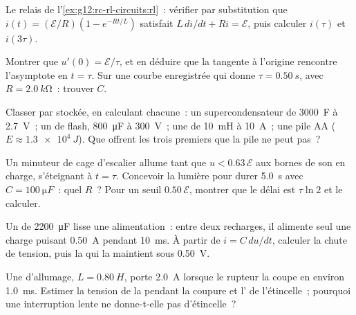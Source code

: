\begin{exercise}[$\star\star$]\label{exo:g12:rc-rl-circuits:10}
Le relais de l'\cref{ex:g12:rc-rl-circuits:rl}~: vérifier par
substitution que $i(t) = (\mathcal{E}/R)(1 - e^{-Rt/L})$ satisfait
$L\,di/dt + Ri = \mathcal{E}$, puis calculer $i(\tau)$ et $i(3\tau)$.
\end{exercise}

\begin{exercise}[$\star\star$]\label{exo:g12:rc-rl-circuits:11}
Montrer que $u'(0) = \mathcal{E}/\tau$, et en déduire que la tangente
à l'origine rencontre l'asymptote en $t = \tau$. Sur une courbe
enregistrée qui donne $\tau = \qty{0.50}{s}$, avec
$R = \qty{2.0}{k\ohm}$~: trouver $C$.
\end{exercise}

\begin{exercise}[$\star\star\star$]\label{exo:g12:rc-rl-circuits:12}
Classer par  stockée, en calculant chacune~: un
supercondensateur de \qty{3000}{F} à \qty{2.7}{V}~; un
 de flash, \qty{800}{\micro F} à
\qty{300}{V}~; une  de \qty{10}{mH} à
\qty{10}{A}~; une pile AA ($E \approx \qty{1.3e4}{J}$). Que offrent
les trois premiers que la pile ne peut pas~?
\end{exercise}

\begin{exercise}[$\star\star\star$]\label{exo:g12:rc-rl-circuits:13}
Un minuteur de cage d'escalier allume tant que $u < 0.63\,\mathcal{E}$
aux bornes de son  en charge, s'éteignant à
$t = \tau$. Concevoir la lumière pour durer \qty{5.0}{s} avec
$C = \qty{100}{\micro F}$~: quel $R$~? Pour un seuil
$0.50\,\mathcal{E}$, montrer que le délai est
$\tau \ln 2$ et le calculer.
\end{exercise}

\begin{exercise}[$\star\star\star$]\label{exo:g12:rc-rl-circuits:14}
Un  de \qty{2200}{\micro F} lisse une
alimentation~: entre deux recharges, il alimente seul une charge
puisant \qty{0.50}{A} pendant \qty{10}{ms}. À partir de
$i = C\,du/dt$, calculer la chute de tension, puis la
 qui la maintient sous \qty{0.50}{V}.
\end{exercise}

\begin{exercise}[$\star\star\star$]\label{exo:g12:rc-rl-circuits:15}
Une  d'allumage, $L = \qty{0.80}{H}$, porte
\qty{2.0}{A} lorsque le rupteur la coupe en environ \qty{1.0}{ms}.
Estimer la tension de la 
pendant la coupure et l' de l'étincelle~; pourquoi
une interruption lente ne donne-t-elle pas d'étincelle~?
\end{exercise}

